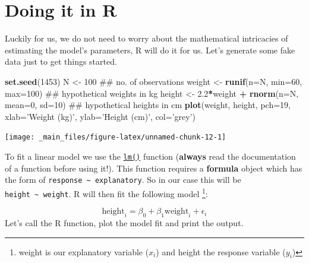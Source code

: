 \documentclass[]{book}
\newenvironment{Shaded}{\begin{snugshade}}{\end{snugshade}}
\newcommand{\KeywordTok}[1]{\textcolor[rgb]{0.13,0.29,0.53}{\textbf{#1}}}
\newcommand{\DataTypeTok}[1]{\textcolor[rgb]{0.13,0.29,0.53}{#1}}
\newcommand{\DecValTok}[1]{\textcolor[rgb]{0.00,0.00,0.81}{#1}}
\newcommand{\FloatTok}[1]{\textcolor[rgb]{0.00,0.00,0.81}{#1}}
\newcommand{\StringTok}[1]{\textcolor[rgb]{0.31,0.60,0.02}{#1}}
\newcommand{\OperatorTok}[1]{\textcolor[rgb]{0.81,0.36,0.00}{\textbf{#1}}}
\newcommand{\NormalTok}[1]{#1}
\let\rmarkdownfootnote\footnote%
\def\footnote{\protect\rmarkdownfootnote}
\theoremstyle{definition}
\theoremstyle{definition}
\theoremstyle{definition}
\theoremstyle{remark}
\begin{document}
\section{Doing it in R}\label{doing-it-in-r}

Luckily for us, we do not need to worry about the mathematical
intricacies of estimating the model's parameters, R will do it for us.
Let's generate some fake data just to get things started.

\begin{Shaded}
\begin{Highlighting}[]
\KeywordTok{set.seed}\NormalTok{(}\DecValTok{1453}\NormalTok{)}
\NormalTok{N <-}\StringTok{ }\DecValTok{100}\NormalTok{ ## no. of observations}
\NormalTok{weight <-}\StringTok{ }\KeywordTok{runif}\NormalTok{(}\DataTypeTok{n=}\NormalTok{N, }\DataTypeTok{min=}\DecValTok{60}\NormalTok{, }\DataTypeTok{max=}\DecValTok{100}\NormalTok{) ## hypothetical weights in kg}
\NormalTok{height <-}\StringTok{ }\FloatTok{2.2}\OperatorTok{*}\NormalTok{weight }\OperatorTok{+}\StringTok{ }\KeywordTok{rnorm}\NormalTok{(}\DataTypeTok{n=}\NormalTok{N, }\DataTypeTok{mean=}\DecValTok{0}\NormalTok{, }\DataTypeTok{sd=}\DecValTok{10}\NormalTok{) ## hypothetical heights in cm}
\KeywordTok{plot}\NormalTok{(weight, height, }\DataTypeTok{pch=}\DecValTok{19}\NormalTok{, }\DataTypeTok{xlab=}\StringTok{'Weight (kg)'}\NormalTok{, }\DataTypeTok{ylab=}\StringTok{'Height (cm)'}\NormalTok{, }\DataTypeTok{col=}\StringTok{'grey'}\NormalTok{)}
\end{Highlighting}
\end{Shaded}

\begin{center}\texttt{[image: \_main\_files/figure-latex/unnamed-chunk-12-1]} \end{center}

To fit a linear model we use the
\href{https://www.rdocumentation.org/packages/stats/versions/3.5.1/topics/lm}{\texttt{lm()}}
function (\textbf{always} read the documentation of a function before
using it!). This function requires a \textbf{formula} object which has
the form of \texttt{response\ \textasciitilde{}\ explanatory}. So in our
case this will be \texttt{height\ \textasciitilde{}\ weight}. R will
then fit the following model \footnote{weight is our explanatory
  variable (\(x_i\)) and height the response variable (\(y_i\))}:

\[
\mathrm{height}_i = \beta_0 + \beta_1\mathrm{weight}_i + \epsilon_i
\] Let's call the R function, plot the model fit and print the output.
\end{document}
